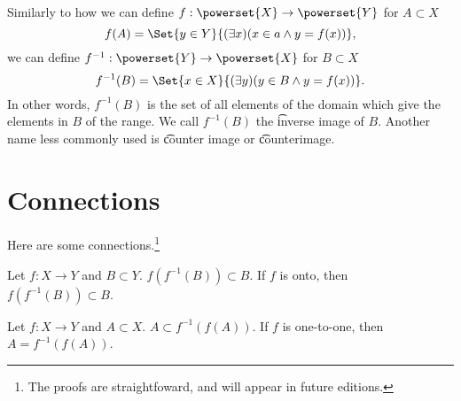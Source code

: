 Similarly to how we can define $f: \powerset{X} \to \powerset{Y}$ for $A \subset X$
\[
f(A) = \Set{y \in Y}{(\exists x)(x \in a \land y = f(x))},
\]
we can define $f^{-1}: \powerset{Y} \to \powerset{X}$ for $B \subset X$
\[
f^{-1}(B) = \Set{x \in X}{(\exists y)(y \in B \land y = f(x))}.
\]
In other words, $f^{-1}(B)$ is the set of all elements of the domain which give the elements in $B$ of the range.
We call $f^{-1}(B)$ the \t{inverse image} of $B$.
Another name less commonly used is \t{counter image} or \t{counterimage}.

\section*{Connections}

Here are some connections.\footnote{The proofs are straightfoward, and will appear in future editions.}
\begin{proposition}
Let $f: X \to Y$ and $B \subset Y$.
$f(f^{-1}(B)) \subset B$. If $f$ is onto, then $f(f^{-1}(B)) \subset B$.
\end{proposition}

\begin{proposition}
Let $f: X \to Y$ and $A \subset X$.
$A \subset f^{-1}(f(A))$.
If $f$ is one-to-one, then $A = f^{-1}(f(A))$.
\end{proposition}
